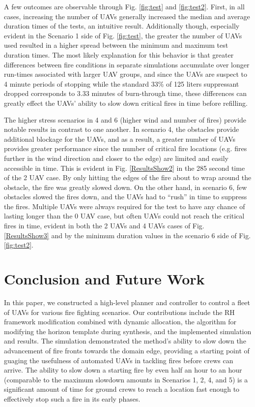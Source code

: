 \documentclass{ieeeaccess}
\begin{document}
A few outcomes are observable through Fig. \ref{fig:test} and \ref{fig:test2}. First, in all cases, increasing the number of UAVs generally increased the median and average duration times of the tests, an intuitive result. Additionally though, especially evident in the Scenario 1 side of Fig. \ref{fig:test}, the greater the number of UAVs used resulted in a higher spread between the minimum and maximum test duration times. The most likely explanation for this behavior is that greater differences between fire conditions in separate simulations accumulate over longer run-times associated with larger UAV groups, and since the UAVs are suspect to 4 minute periods of stopping while the standard 33\% of 125 liters suppressant dropped corresponds to 3.33 minutes of burn-through time, these differences can greatly effect the UAVs' ability to slow down critical fires in time before refilling. 

The higher stress scenarios in 4 and 6 (higher wind and number of fires) provide notable results in contrast to one another. In scenario 4, the obstacles provide additional blockage for the UAVs, and as a result, a greater number of UAVs provides greater performance since the number of critical fire locations (e.g. fires further in the wind direction and closer to the edge) are limited and easily accessible in time. This is evident in Fig. \ref{ResultsShow2} in the 285 second time of the 2 UAV case. By only hitting the edges of the fire about to wrap around the obstacle, the fire was greatly slowed down. On the other hand, in scenario 6, few obstacles slowed the fires down, and the UAVs had to ``rush'' in time to suppress the fires. Multiple UAVs were always required for the test to have any chance of lasting longer than the 0 UAV case, but often UAVs could not reach the critical fires in time, evident in both the 2 UAVs and 4 UAVs cases of Fig. \ref{ResultsShow3} and by the minimum duration values in the scenario 6 side of Fig. \ref{fig:test2}.
\section{Conclusion and Future Work}

In this paper, we constructed a high-level planner and controller to control a fleet of UAVs for various fire fighting scenarios. Our contributions include the RH framework modification combined with dynamic allocation, the algorithm for modifying the horizon template during synthesis, and the implemented simulation and results. The simulation demonstrated the method's ability to slow down the advancement of fire fronts towards the domain edge, providing a starting point of guaging the usefulness of automated UAVs in tackling fires before crews can arrive. The ability to slow down a starting fire by even half an hour to an hour (comparable to the maximum slowdown amounts in Scenarios 1, 2, 4, and 5) is a significant amount of time for ground crews to reach a location fast enough to effectively stop such a fire in its early phases.
\end{document}
